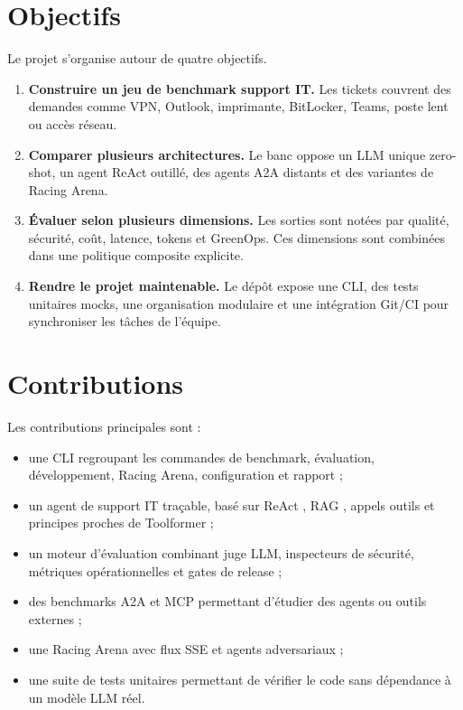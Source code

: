 \section{Objectifs}

Le projet s'organise autour de quatre objectifs.

\begin{enumerate}[label=\textbf{O\arabic*.}]
  \item \textbf{Construire un jeu de benchmark support IT.} Les tickets couvrent
  des demandes comme VPN, Outlook, imprimante, BitLocker, Teams, poste lent ou
  accès réseau.

  \item \textbf{Comparer plusieurs architectures.} Le banc oppose un LLM unique
  zero-shot, un agent ReAct outillé, des agents A2A distants et des variantes de
  Racing Arena.

  \item \textbf{Évaluer selon plusieurs dimensions.} Les sorties sont notées
  par qualité, sécurité, coût, latence, tokens et GreenOps. Ces dimensions sont
  combinées dans une politique composite explicite.

  \item \textbf{Rendre le projet maintenable.} Le dépôt expose une CLI, des
  tests unitaires mocks, une organisation modulaire et une intégration Git/CI
  pour synchroniser les tâches de l'équipe.
\end{enumerate}

\section{Contributions}

Les contributions principales sont :

\begin{itemize}
  \item une CLI  regroupant les commandes de benchmark,
  évaluation, développement, Racing Arena, configuration et rapport ;
  \item un agent de support IT traçable, basé sur ReAct \cite{react2023}, RAG
  \cite{rag2020}, appels outils et principes proches de Toolformer
  \cite{toolformer2023} ;
  \item un moteur d'évaluation combinant juge LLM, inspecteurs de sécurité,
  métriques opérationnelles et gates de release ;
  \item des benchmarks A2A et MCP permettant d'étudier des agents ou outils
  externes ;
  \item une Racing Arena avec flux SSE et agents adversariaux ;
  \item une suite de tests unitaires permettant de vérifier le code sans
  dépendance à un modèle LLM réel.
\end{itemize}
